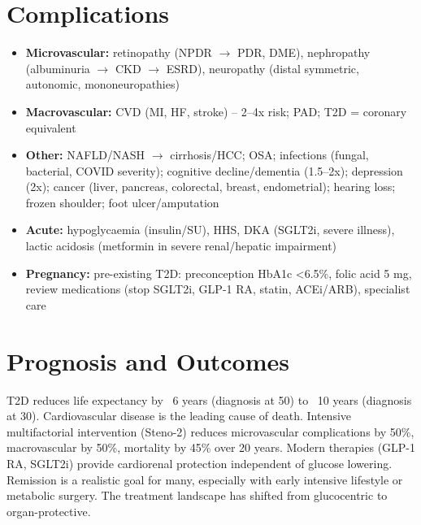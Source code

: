 \section*{Complications}
\begin{itemize}
    \item \textbf{Microvascular:} retinopathy (NPDR $\to$ PDR, DME), nephropathy (albuminuria $\to$ CKD $\to$ ESRD), neuropathy (distal symmetric, autonomic, mononeuropathies)
    \item \textbf{Macrovascular:} CVD (MI, HF, stroke) -- 2--4x risk; PAD; T2D = coronary equivalent
    \item \textbf{Other:} NAFLD/NASH $\to$ cirrhosis/HCC; OSA; infections (fungal, bacterial, COVID severity); cognitive decline/dementia (1.5--2x); depression (2x); cancer (liver, pancreas, colorectal, breast, endometrial); hearing loss; frozen shoulder; foot ulcer/amputation
    \item \textbf{Acute:} hypoglycaemia (insulin/SU), HHS, DKA (SGLT2i, severe illness), lactic acidosis (metformin in severe renal/hepatic impairment)
    \item \textbf{Pregnancy:} pre-existing T2D: preconception HbA1c <6.5\%, folic acid 5 mg, review medications (stop SGLT2i, GLP-1 RA, statin, ACEi/ARB), specialist care
\end{itemize}

\section*{Prognosis and Outcomes}
T2D reduces life expectancy by ~6 years (diagnosis at 50) to ~10 years (diagnosis at 30). Cardiovascular disease is the leading cause of death. Intensive multifactorial intervention (Steno-2) reduces microvascular complications by 50\%, macrovascular by 50\%, mortality by 45\% over 20 years. Modern therapies (GLP-1 RA, SGLT2i) provide cardiorenal protection independent of glucose lowering. Remission is a realistic goal for many, especially with early intensive lifestyle or metabolic surgery. The treatment landscape has shifted from glucocentric to organ-protective.

